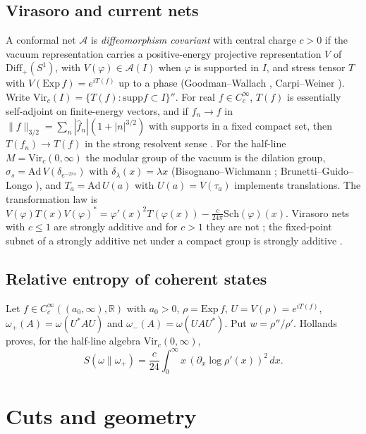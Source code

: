 \documentclass[12pt]{article}
\theoremstyle{definition}
\theoremstyle{remark}
\begin{document}
\subsection{Virasoro and current nets}

A conformal net \(\mathcal A\) is \emph{diffeomorphism covariant} with central
charge \(c>0\) if the vacuum representation carries a positive-energy projective
representation \(V\) of \(\mathrm{Diff}_+(S^1)\), with \(V(\varphi)\in\mathcal A(I)\)
when \(\varphi\) is supported in \(I\), and stress tensor \(T\) with
\(V(\mathrm{Exp}\,f)=e^{iT(f)}\) up to a phase (Goodman--Wallach \cite{GW}, Carpi--Weiner \cite{CW}).
Write \(\mathrm{Vir}_c(I)=\{T(f):\mathrm{supp}f\subset I\}''\). For real \(f\in
C_c^\infty\), \(T(f)\) is essentially self-adjoint on finite-energy vectors, and if
\(f_n\to f\) in \(\|f\|_{3/2}=\sum_n|\hat f_n|(1+|n|^{3/2})\) with supports in a fixed
compact set, then \(T(f_n)\to T(f)\) in the strong resolvent sense
\cite[Thm.~4.4, Prop.~4.5]{CW}. For the half-line \(M=\mathrm{Vir}_c(0,\infty)\) the
modular group of the vacuum is the dilation group, \(\sigma_s=\mathrm{Ad}\,V(\delta_{e^{-2\pi s}})\)
with \(\delta_\lambda(x)=\lambda x\) (Bisognano--Wichmann \cite{BW}; Brunetti--Guido--Longo \cite{BGL}), and \(T_a=\mathrm{Ad}\,U(a)\) with \(U(a)=V(\tau_a)\) implements
translations. The transformation law is
\(V(\varphi)T(x)V(\varphi)^*=\varphi'(x)^2T(\varphi(x))-\tfrac c{24\pi}\mathrm{Sch}(\varphi)(x)\).
Virasoro nets with \(c\le1\) are strongly additive and for \(c>1\) they are not
\cite[\S2.4]{Carpi}; the fixed-point subnet of a strongly additive net under a
compact group is strongly additive \cite{Xu}.

\subsection{Relative entropy of coherent states}\label{sec:hollands}

Let \(f\in C_c^\infty((a_0,\infty),\mathbb R)\) with \(a_0>0\), \(\rho=\mathrm{Exp}\,f\),
\(U=V(\rho)=e^{iT(f)}\), \(\omega_+(A)=\omega(U^*AU)\) and
\(\omega_-(A)=\omega(UAU^*)\). Put \(w=\rho''/\rho'\). Hollands
\cite[Thm.~1]{Hollands} proves, for the half-line algebra \(\mathrm{Vir}_c(0,\infty)\),
\begin{equation}\label{eq:hollands}
S(\omega\|\omega_+)=\frac{c}{24}\int_0^\infty x\,(\partial_x\log\rho'(x))^2\,dx .
\end{equation}

\section{Cuts and geometry}\label{sec:cut}
\end{document}
